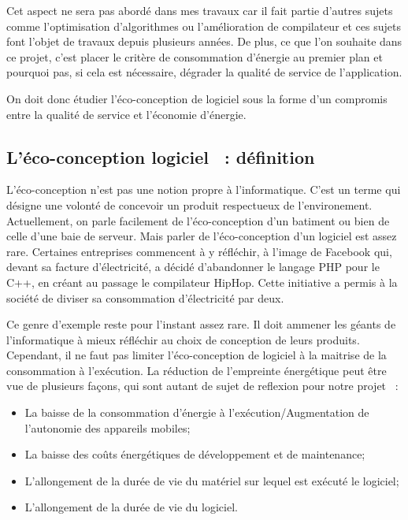 \documentclass[a4paper, 11pt]{report}
\begin{document}
Cet aspect ne sera pas abordé dans mes travaux car il fait partie d'autres sujets comme l'optimisation d'algorithmes ou l'amélioration de compilateur et  ces sujets font l'objet de travaux depuis plusieurs années. De plus, ce que l'on souhaite dans ce projet, c'est placer le critère de consommation d'énergie au premier plan et pourquoi pas, si cela est nécessaire, dégrader la qualité de service de l'application\cite{MelloFerreira:2009:EDS:1696051.1696061}.

On doit donc étudier l'éco-conception de logiciel sous la forme d'un compromis entre la qualité de service et l'économie d'énergie\cite{Baek:2010:GFS:1809028.1806620}.
		
		\subsection{L'éco-conception logiciel ~: définition}
L'éco-conception n'est pas une notion propre à l'informatique. C'est un terme qui désigne une volonté de concevoir un produit respectueux de l'environement. Actuellement, on parle facilement de l'éco-conception d'un batiment ou bien de celle d'une baie de serveur. Mais parler de l'éco-conception d'un logiciel est assez rare. Certaines entreprises commencent à y réfléchir, à l'image de Facebook qui, devant sa facture d'électricité, a décidé d'abandonner le langage PHP pour le C++, en créant au passage le compilateur HipHop\cite{EcoLogiciels}. Cette initiative a permis à la société de diviser sa consommation d'électricité par deux.

Ce genre d'exemple reste pour l'instant assez rare. Il doit ammener les géants de l'informatique à mieux réfléchir au choix de conception de leurs produits. Cependant, il ne faut pas limiter l'éco-conception de logiciel à la maitrise de la consommation à l'exécution. La réduction de l’empreinte énergétique peut être vue de plusieurs façons, qui sont autant de sujet de reflexion pour notre projet ~:
\begin{itemize}
	\item La baisse de la consommation d’énergie à l'exécution/Augmentation de l’autonomie des appareils mobiles;
	\item La baisse des coûts énergétiques de développement et de maintenance;
	\item L'allongement de la durée de vie du matériel sur lequel est exécuté le logiciel;
	\item L'allongement de la durée de vie du logiciel.
\end{itemize}
\end{document}
